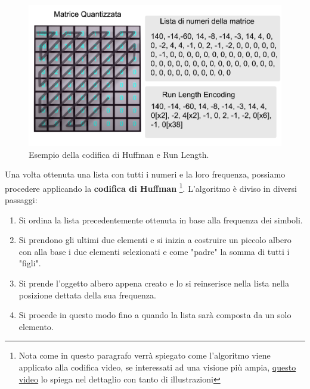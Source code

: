 \documentclass[a4paper,12pt, oneside]{article}
\begin{document}
\begin{figure}[h]
    \centering
    \includegraphics[width=1\textwidth]{images/huffman-example.png}
    \caption{Esempio della codifica di Huffman e Run Length.}
    \label{fig:huffman_example}
\end{figure}

Una volta ottenuta una lista con tutti i numeri e la loro frequenza, possiamo procedere applicando
la \textbf{codifica di Huffman} \footnote{Nota come in questo paragrafo verrà spiegato come l'algoritmo
viene applicato alla codifica video, se interessati ad una visione più ampia,
\href{https://www.youtube.com/watch?v=JsTptu56GM8}{questo video} lo spiega nel dettaglio con tanto
di illustrazioni}. L'algoritmo è diviso in diversi passaggi:

\begin{enumerate}
    \item Si ordina la lista precedentemente ottenuta in base alla frequenza dei simboli.
    \item Si prendono gli ultimi due elementi e si inizia a costruire un piccolo albero con alla base i due
    elementi selezionati e come "padre" la somma di tutti i "figli".
    \item Si prende l'oggetto albero appena creato e lo si reinserisce nella lista nella posizione dettata
    della sua frequenza.
    \item Si procede in questo modo fino a quando la lista sarà composta da un solo elemento.
\end{enumerate}
\end{document}
